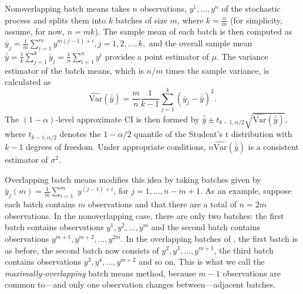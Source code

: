 \documentclass[12pt]{article}
\newcommand{\varhat}{\widehat{\mathrm{Var}}}
\newcommand{\yb}{\bar{y}}
\newcommand{\ybb}{\bar{\yb}}
\begin{document}
Nonoverlapping batch means takes $n$ observations, $y^1, \dots, y^n$ of the stochastic process and splits them into $k$ batches of size $m$, where $k = \frac{n}{m}$ (for simplicity, assume, for now, $n = mk$).  
The sample mean of each batch is then computed as
$
	\yb_j = \frac{1}{m} \sum_{i=1}^{m} y^{m(j-1)+i}, j = 1,2, \dots, k,
$
and the overall sample mean $\ybb = \frac{1}{k} \sum_{j=1}^k \yb_j = \frac{1}{n} \sum_{i=1}^n y^i$ provides a point estimator of $\mu$.  
The variance estimator of the batch means, which is $n/m$ times the sample variance, is calculated as
\begin{equation} \label{eq:var}
	\varhat(\ybb) = \frac{m}{n}\frac{1}{k-1} \sum_{j=1}^k \left( \yb_j - \ybb \right)^2.
\end{equation}
The $(1-\alpha)$-level approximate CI is then formed by $\ybb \pm t_{k-1,\alpha/2} \sqrt{\varhat(\ybb)}$, where $t_{k-1,\alpha/2}$ denotes the $1-\alpha/2$ quantile of the Student's t distribution with $k-1$ degrees of freedom.  
Under appropriate conditions, $n\varhat(\ybb)$ is a consistent estimator of $\sigma^2$.


Overlapping batch means modifies this idea by taking batches given by $\yb_j(m) = \frac{1}{m} \sum_{i=1}^{m}$ $y^{(j-1)+i}$, for $j = 1, \dots, n-m+1$.
As an example, suppose each batch contains $m$ observations and that there are a total of $n=2m$ observations.
In the nonoverlapping case, there are only two batches: the first batch contains observations $y^1, y^2, \dots, y^m$ and the second batch contains observations $y^{m+1}, y^{m+2}, \dots, y^{2m}$.   
In the overlapping batches of \citet{Meketon1984}, the first batch is as before, the second batch now consists of $y^2, y^3, \dots, y^{m+1}$, the third batch contains observations $y^3, y^4, \dots, y^{m+2}$ and so on.  
This is what we call the \emph{maximally-overlapping} batch means method, because $m-1$ observations are common to---and only one observation changes between---adjacent batches.  
\end{document}
